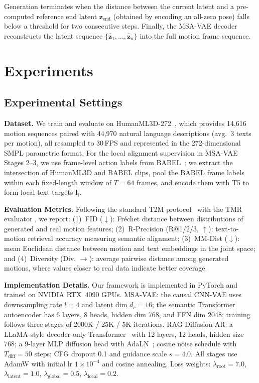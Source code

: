 \documentclass{article}
\begin{document}
Generation terminates when the distance between the current latent and a pre-computed reference
end latent \(\mathbf{z}_{\text{end}}\) (obtained by encoding an all-zero pose) falls below a
threshold for two consecutive steps. Finally, the MSA-VAE decoder reconstructs the latent
sequence \(\{\hat{\mathbf{z}}_1, \dots, \hat{\mathbf{z}}_n\}\) into the full motion frame sequence.





\section{Experiments}
\subsection{Experimental Settings}

\textbf{Dataset.}
We train and evaluate on HumanML3D-272~\citep{xiao2025motionstreamer}, which provides 14,616 motion sequences paired with 44,970 natural language descriptions (avg.\ 3 texts per motion), all resampled to 30\,FPS and represented in the 272-dimensional SMPL parametric format.
For the local alignment supervision in MSA-VAE Stages 2--3, we use frame-level action labels from BABEL~\citep{punnakkal2021babel}: we extract the intersection of HumanML3D and BABEL clips, pool the BABEL frame labels within each fixed-length window of \(T{=}64\) frames, and encode them with T5 to form local text targets \(\mathbf{l}_i\).

\textbf{Evaluation Metrics.}
Following the standard T2M protocol~\citep{Guo_2022_CVPR} with the TMR evaluator \citep{petrovich2023tmr}, we report:
(1)~FID (\(\downarrow\)): Fréchet distance between distributions of generated and real motion features;
(2)~R-Precision (R@1/2/3, \(\uparrow\)): text-to-motion retrieval accuracy measuring semantic alignment;
(3)~MM-Dist (\(\downarrow\)): mean Euclidean distance between motion and text embeddings in the joint space; and
(4)~Diversity (Div, \(\rightarrow\)): average pairwise distance among generated motions, where values closer to real data indicate better coverage.

\textbf{Implementation Details.}
Our framework is implemented in PyTorch and trained on NVIDIA RTX~4090 GPUs.
MSA-VAE: the causal CNN-VAE uses downsampling rate \(l{=}4\) and latent dim \(d_c{=}16\); the semantic Transformer autoencoder has 6 layers, 8 heads, hidden dim 768, and FFN dim 2048; training follows three stages of 2000K / 25K / 5K iterations.
RAG-Diffusion-AR: a LLaMA-style decoder-only Transformer~\citep{touvron2023llama} with 12 layers, 12 heads, hidden size 768; a 9-layer MLP diffusion head with AdaLN~\citep{peebles2023scalable}; cosine noise schedule with \(T_{\text{diff}}{=}50\) steps; CFG dropout 0.1 and guidance scale \(s{=}4.0\).
All stages use AdamW with initial lr \(1{\times}10^{-4}\) and cosine annealing.
Loss weights: \(\lambda_{\text{root}}{=}7.0\), \(\lambda_{\text{latent}}{=}1.0\), \(\lambda_{\text{global}}{=}0.5\), \(\lambda_{\text{local}}{=}0.2\).
\end{document}
